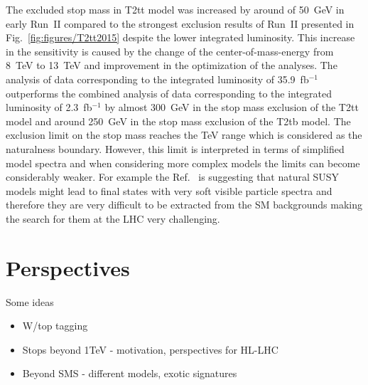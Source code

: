 The excluded stop mass in T2tt model was increased by around of 50~GeV in early Run~II compared to the strongest exclusion results of Run~II presented in Fig.~\ref{fig:figures/T2tt2015} despite the lower integrated luminosity. This increase in the sensitivity is caused by the change of the center-of-mass-energy from 8~TeV to 13~TeV and improvement in the optimization of the analyses. The analysis of data corresponding to the integrated luminosity of 35.9~fb$^{-1}$ outperforms the combined analysis of data corresponding to the integrated luminosity of 2.3~fb$^{-1}$ by almost 300~GeV in the stop mass exclusion of the T2tt model and around 250~GeV in the stop mass exclusion of the T2tb model. The exclusion limit on the stop mass reaches the TeV range which is considered as the naturalness boundary. However, this limit is interpreted in terms of simplified model spectra and when considering more complex models the limits can become considerably weaker. For example the Ref.~\cite{Baer:2012uy} is suggesting that natural SUSY models might lead to final states with very soft visible particle spectra and therefore they are very difficult to be extracted from the SM backgrounds making the search for them at the LHC very challenging.



\section{Perspectives}

Some ideas

\begin{itemize}
\item W/top tagging
\item Stops beyond 1TeV  - motivation, perspectives for HL-LHC
\item Beyond SMS - different models, exotic signatures
\end{itemize}



	


